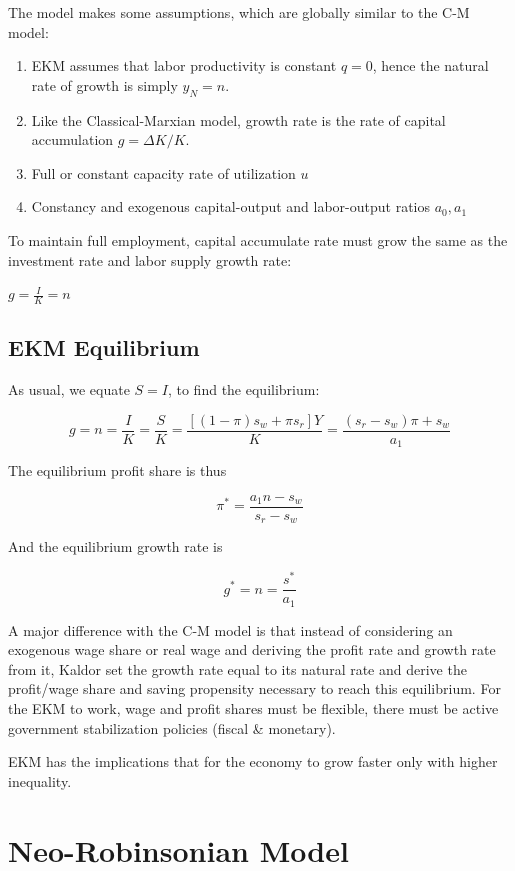 \documentclass[
  letterpaper,
  DIV=11,
  numbers=noendperiod]{scrreprt}
\begin{document}
The model makes some assumptions, which are globally similar to the C-M
model:

\begin{enumerate}
\def\labelenumi{\arabic{enumi}.}
\item
  EKM assumes that labor productivity is constant \(q=0\), hence the
  natural rate of growth is simply \(y_N=n\).
\item
  Like the Classical-Marxian model, growth rate is the rate of capital
  accumulation \(g = \Delta K/K\).
\item
  Full or constant capacity rate of utilization \(u\)
\item
  Constancy and exogenous capital-output and labor-output ratios
  \(a_0,a_1\)
\end{enumerate}

To maintain full employment, capital accumulate rate must grow the same
as the investment rate and labor supply growth rate:

\(g = \frac{I}{K} = n\)

\hypertarget{ekm-equilibrium}{%
\subsection{EKM Equilibrium}\label{ekm-equilibrium}}

As usual, we equate \(S = I\), to find the equilibrium:

\[g = n = \frac{I}{K} = \frac{S}{K} = \frac{[(1-\pi)s_w+\pi s_r]Y}{K} = \frac{(s_r-s_w)\pi + s_w}{a_1}\]

The equilibrium profit share is thus

\[\pi^* = \frac{a_1 n - s_w}{s_r - s_w}\]

And the equilibrium growth rate is

\[g^* = n = \frac{s^*}{a_1}\]

A major difference with the C-M model is that instead of considering an
exogenous wage share or real wage and deriving the profit rate and
growth rate from it, Kaldor set the growth rate equal to its natural
rate and derive the profit/wage share and saving propensity necessary to
reach this equilibrium. For the EKM to work, wage and profit shares must
be flexible, there must be active government stabilization policies
(fiscal \& monetary).

EKM has the implications that for the economy to grow faster only with
higher inequality.

\hypertarget{neo-robinsonian-model}{%
\section{Neo-Robinsonian Model}\label{neo-robinsonian-model}}
\end{document}
